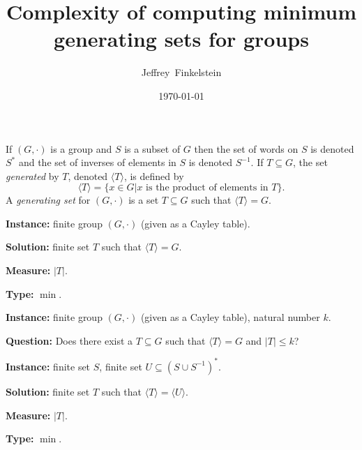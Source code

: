 \documentclass[]{article}
\title{Complexity of computing minimum generating sets for groups}
\author{Jef{}frey~Finkelstein}
\date{\today}
\newcommand{\gen}[1]{{\langle #1 \rangle}}
\begin{document}
\maketitle


If $(G, \cdot)$ is a group and $S$ is a subset of $G$ then the set of words on $S$ is denoted $S^*$ and the set of inverses of elements in $S$ is denoted $S^{-1}$.
If $T \subseteq G$, the set \emph{generated} by $T$, denoted $\gen{T}$, is defined by
\begin{equation*}
  \gen{T} = \{ x \in G | x \text{ is the product of elements in } T \}.
\end{equation*}
A \emph{generating set} for $(G, \cdot)$ is a set $T \subseteq G$ such that $\gen{T} = G$.


\begin{definition}
  \mbox{}

  \textbf{Instance:} finite group $(G, \cdot)$ (given as a Cayley table).

  \textbf{Solution:} finite set $T$ such that $\gen{T} = G$.

  \textbf{Measure:} $|T|$.

  \textbf{Type:} $\min$.
\end{definition}

\begin{definition}
  \mbox{}

  \textbf{Instance:} finite group $(G, \cdot)$ (given as a Cayley table), natural number $k$.

  \textbf{Question:} Does there exist a $T \subseteq G$ such that $\gen{T} = G$ and $|T| \leq k$?
\end{definition}

\begin{definition}
  \mbox{}

  \textbf{Instance:} finite set $S$, finite set $U \subseteq (S \cup S^{-1})^*$.

  \textbf{Solution:} finite set $T$ such that $\gen{T} = \gen{U}$.

  \textbf{Measure:} $|T|$.

  \textbf{Type:} $\min$.
\end{definition}
\end{document}
